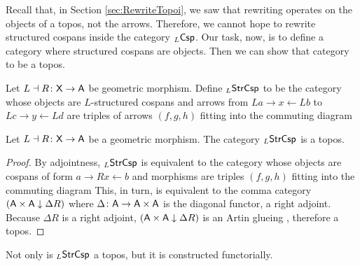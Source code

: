 \documentclass{amsart}
\begin{document}
Recall that, in Section \ref{sec:RewriteTopoi}, we saw
that rewriting operates on the objects of a topos,
not the arrows. Therefore, we cannot hope to rewrite
structured cospans inside the category $ _L\mathsf{Csp} $. Our
task, now, is to define a category where structured
cospans are objects. Then we can show that category to be a
topos.

\begin{definition} \label{df:morph-of-strcsp} Let
  $ L \dashv R \colon \mathsf{X} \to \mathsf{A} $ be geometric
  morphism. Define $ _L \mathsf{StrCsp} $ to be the category whose
  objects are $ L $-structured cospans and arrows from
  $ La \to x \gets Lb $ to $ Lc \to y \gets Ld $ are triples
  of arrows $ ( f,g,h ) $ fitting into the commuting diagram
  
\end{definition}

\begin{theorem} \label{thm:strcsp-istopos} Let
  $ L \dashv R \colon \mathsf{X} \to \mathsf{A} $ be a geometric
  morphism.  The category $ _{L}\mathsf{StrCsp} $ is a
  topos.
\end{theorem}
\begin{proof}
  By adjointness, $ _{L}\mathsf{StrCsp} $ is equivalent to
  the category whose objects are cospans of form
  $ a \to Rx \gets b $ and morphisms are triples
  $ ( f,g,h ) $ fitting into the commuting diagram
   This, in
  turn, is equivalent to the comma category
  $ ( \mathsf{A} \times \mathsf{A} \downarrow \Delta R ) $ where
  $ \Delta \colon \mathsf{A} \to \mathsf{A} \times \mathsf{A} $ is the
  diagonal functor, a right adjoint. Because
  $ \Delta R $ is a right adjoint,
  $ ( \mathsf{A} \times \mathsf{A} \downarrow \Delta R ) $ is an
  Artin glueing \cite{Wraith_ArtinGlue}, therefore
  a topos.
\end{proof}

Not only is $ _L\mathsf{StrCsp} $ a topos, but it is constructed functorially.
\end{document}
